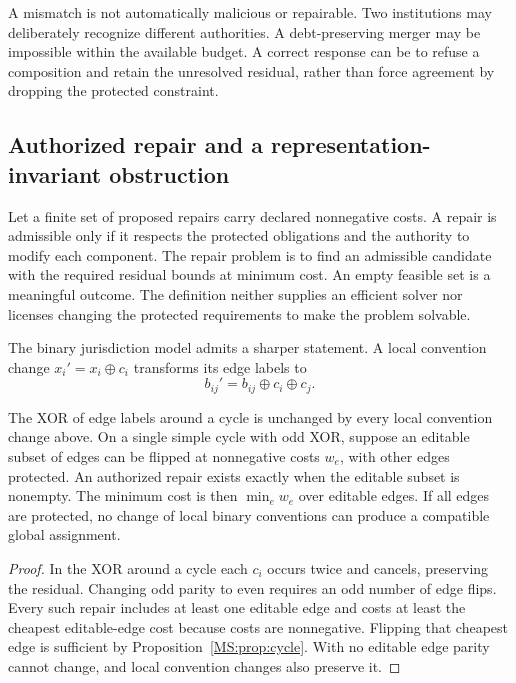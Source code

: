 A mismatch is not automatically malicious or repairable. Two institutions may deliberately recognize different authorities. A debt-preserving merger may be impossible within the available budget. A correct response can be to refuse a composition and retain the unresolved residual, rather than force agreement by dropping the protected constraint.

\subsection{Authorized repair and a representation-invariant obstruction}
Let a finite set of proposed repairs carry declared nonnegative costs. A repair is admissible only if it respects the protected obligations and the authority to modify each component. The repair problem is to find an admissible candidate with the required residual bounds at minimum cost. An empty feasible set is a meaningful outcome. The definition neither supplies an efficient solver nor licenses changing the protected requirements to make the problem solvable.

The binary jurisdiction model admits a sharper statement. A local convention change $x_i'=x_i\oplus c_i$ transforms its edge labels to
\[
b_{ij}'=b_{ij}\oplus c_i\oplus c_j.
\]

\begin{MSproposition}\label{MS:prop:cyclerepair}
The XOR of edge labels around a cycle is unchanged by every local convention change above. On a single simple cycle with odd XOR, suppose an editable subset of edges can be flipped at nonnegative costs $w_e$, with other edges protected. An authorized repair exists exactly when the editable subset is nonempty. The minimum cost is then $\min_e w_e$ over editable edges. If all edges are protected, no change of local binary conventions can produce a compatible global assignment.
\end{MSproposition}
\begin{proof}
In the XOR around a cycle each $c_i$ occurs twice and cancels, preserving the residual. Changing odd parity to even requires an odd number of edge flips. Every such repair includes at least one editable edge and costs at least the cheapest editable-edge cost because costs are nonnegative. Flipping that cheapest edge is sufficient by Proposition~\ref{MS:prop:cycle}. With no editable edge parity cannot change, and local convention changes also preserve it.
\end{proof}

